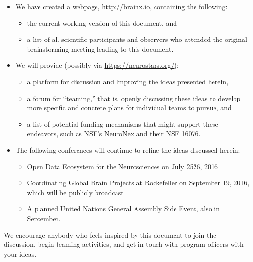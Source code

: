 \documentclass{amsart}
\begin{document}
\begin{itemize}
  \item We have created a webpage, \href{http://brainx.io}{http://brainx.io}, containing the
    following:
    \begin{itemize}
      \item the current working version of this document, and
      \item a list of all scientific participants and observers who
        attended the original brainstorming meeting leading to this document.
    \end{itemize}
  \item We will provide (possibly via 
        \href{https://neurostars.org/}{https://neurostars.org/}):
    \begin{itemize}
      \item a platform for discussion and improving the ideas presented
        herein, 
      \item a forum for ``teaming,'' that is, openly discussing these
        ideas to develop more
        specific and concrete plans for individual teams to pursue, and

      \item a list of potential funding mechanisms that might support
        these endeavors, such as NSF’s 
        \href{http://www.nsf.gov/pubs/2016/nsf16569/nsf16569.htm}{NeuroNex} 
        and their
        \href{http://www.nsf.gov/pubs/2016/nsf16076/nsf16076.jsp}{NSF 16­076}.
    \end{itemize}
  \item The following conferences will continue to refine the ideas
    discussed herein:
    \begin{itemize}
      \item Open Data Ecosystem for the Neurosciences on July 25­26,
        2016
      \item Coordinating Global Brain Projects at Rockefeller on
        September 19, 2016, which will be publicly broadcast
      \item A planned United Nations General Assembly Side Event, also
        in September.
    \end{itemize}
\end{itemize}

We encourage anybody who feels inspired by this document to join the
discussion, begin teaming activities, and get in touch with program
officers with your ideas.
\end{document}
